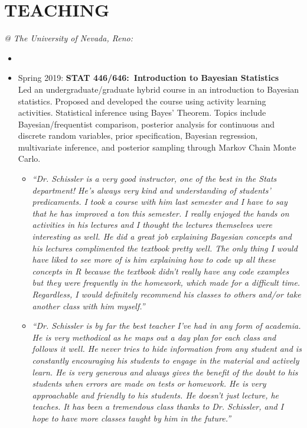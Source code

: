 \documentclass[paper=a4,fontsize=11pt]{scrartcl} %
\newcommand{\NewPart}[2]{\section*{\uppercase{#1} #2 }}
\newcommand{\CourseEntry}[3]{
		\noindent \item{#1: \textbf{#2} \\ #3}}
\begin{document}
\NewPart{Teaching}{}
\vspace{-7pt}
\textit{@ The University of Nevada, Reno:}
\begin{itemize}[noitemsep]
\item[]
\vspace{-15pt}

\CourseEntry{Spring 2019}{STAT 446/646:~Introduction to Bayesian Statistics}{Led an undergraduate/graduate hybrid course in an introduction to Bayesian statistics. Proposed and developed the course using activity learning activities. Statistical inference using Bayes’ Theorem. Topics include Bayesian/frequentist comparison, posterior analysis for continuous and discrete random variables, prior specification, Bayesian regression, multivariate inference, and posterior sampling through Markov Chain Monte Carlo.

\begin{itemize}
\item \emph{\small{``Dr. Schissler is a very good instructor, one of the best in the Stats department! He's always very kind and understanding of students' predicaments. I took a course with him last semester and I have to say that he has improved a ton this semester. I really enjoyed the hands on activities in his lectures and I thought the lectures themselves were interesting as well. He did a great job explaining Bayesian concepts and his lectures
complimented the textbook pretty well. The only thing I would have liked to see more of is him explaining how to
code up all these concepts in R because the textbook didn't really have any code examples but they were
frequently in the homework, which made for a difficult time. Regardless, I would definitely recommend his classes
to others and/or take another class with him myself.''}}
\item \emph{\small{``Dr. Schissler is by far the best teacher I've had in any form of academia. He is very methodical as he maps out a day plan for each class and follows it well. He never tries to hide information from any student and is constantly encouraging his students to engage in the material and actively learn. He is very generous and always gives the benefit of the doubt to his students when errors are made on tests or homework. He is very approachable and friendly to his students. He doesn't just lecture, he teaches. It has been a tremendous class thanks to Dr. Schissler, and I hope to have more classes taught by him in the future.''}}
\end{itemize}
}{} 


\end{itemize}
\end{document}
